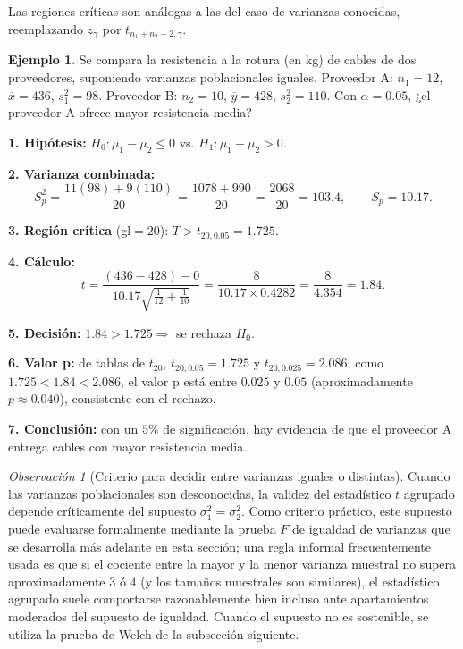 \documentclass[11pt,a4paper]{article}
\theoremstyle{plain}
\theoremstyle{definition}
\newtheorem{ejemplo}[teorema]{Ejemplo}
\theoremstyle{remark}
\newtheorem{observacion}[teorema]{Observación}
\begin{document}
Las regiones críticas son análogas a las del caso de varianzas conocidas, reemplazando $z_\gamma$ por $t_{n_1+n_2-2,\gamma}$.

\begin{ejemplo}
Se compara la resistencia a la rotura (en kg) de cables de dos proveedores, suponiendo varianzas poblacionales iguales. Proveedor A: $n_1=12$, $\overline x=436$, $s_1^2=98$. Proveedor B: $n_2=10$, $\overline y=428$, $s_2^2=110$. Con $\alpha=0.05$, ¿el proveedor A ofrece mayor resistencia media?

\textbf{1. Hipótesis:} $H_0:\mu_1-\mu_2\le0$ vs. $H_1:\mu_1-\mu_2>0$.

\textbf{2. Varianza combinada:}
\[
S_p^2=\frac{11(98)+9(110)}{20}=\frac{1078+990}{20}=\frac{2068}{20}=103.4,\qquad S_p=10.17.
\]

\textbf{3. Región crítica} (gl$=20$): $T>t_{20,0.05}=1.725$.

\textbf{4. Cálculo:}
\[
t=\frac{(436-428)-0}{10.17\sqrt{\tfrac1{12}+\tfrac1{10}}}=\frac{8}{10.17\times0.4282}=\frac{8}{4.354}=1.84.
\]

\textbf{5. Decisión:} $1.84>1.725\Rightarrow$ se rechaza $H_0$.

\textbf{6. Valor p:} de tablas de $t_{20}$, $t_{20,0.05}=1.725$ y $t_{20,0.025}=2.086$; como $1.725<1.84<2.086$, el valor p está entre $0.025$ y $0.05$ (aproximadamente $p\approx0.040$), consistente con el rechazo.

\textbf{7. Conclusión:} con un $5\%$ de significación, hay evidencia de que el proveedor A entrega cables con mayor resistencia media.
\end{ejemplo}

\begin{observacion}[Criterio para decidir entre varianzas iguales o distintas]
Cuando las varianzas poblacionales son desconocidas, la validez del estadístico $t$ agrupado depende críticamente del supuesto $\sigma_1^2=\sigma_2^2$. Como criterio práctico, este supuesto puede evaluarse formalmente mediante la prueba $F$ de igualdad de varianzas que se desarrolla más adelante en esta sección; una regla informal frecuentemente usada es que si el cociente entre la mayor y la menor varianza muestral no supera aproximadamente $3$ ó $4$ (y los tamaños muestrales son similares), el estadístico agrupado suele comportarse razonablemente bien incluso ante apartamientos moderados del supuesto de igualdad. Cuando el supuesto no es sostenible, se utiliza la prueba de Welch de la subsección siguiente.
\end{observacion}
\end{document}
